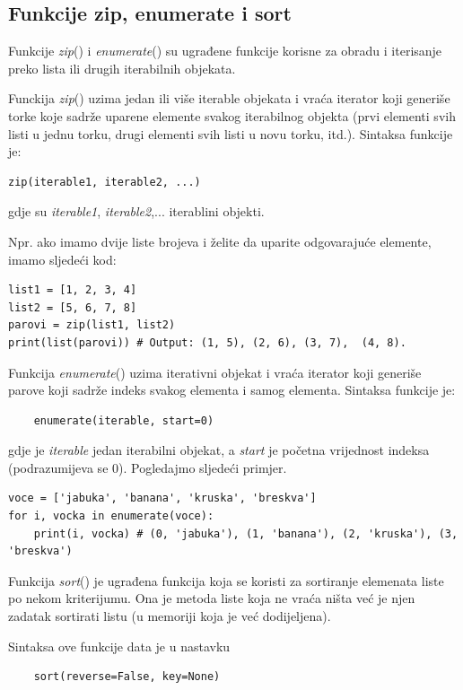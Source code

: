 \subsection{Funkcije zip, enumerate i sort}
Funkcije  \textit{zip}() i \textit{enumerate}() su ugrađene funkcije korisne za obradu i iterisanje preko lista ili drugih iterabilnih objekata.

Funckija \textit{zip}() uzima jedan ili više iterable objekata i vraća iterator koji generiše torke koje sadrže uparene elemente svakog iterabilnog objekta (prvi elementi svih listi u jednu torku, drugi elementi svih listi u novu torku, itd.). Sintaksa funkcije je:
\begin{verbatim}
zip(iterable1, iterable2, ...)
\end{verbatim}
gdje su \emph{iterable1}, \emph{iterable2},... iterablini objekti. 

Npr. ako imamo dvije liste brojeva i želite da uparite odgovarajuće elemente, imamo sljedeći kod:
\begin{verbatim}
list1 = [1, 2, 3, 4]
list2 = [5, 6, 7, 8]
parovi = zip(list1, list2) 
print(list(parovi)) # Output: (1, 5), (2, 6), (3, 7),  (4, 8).
\end{verbatim}
Funkcija \textit{enumerate}() uzima iterativni objekat i vraća iterator koji generiše parove koji sadrže indeks svakog elementa i samog elementa. Sintaksa funkcije je:
\begin{verbatim}
	enumerate(iterable, start=0)
\end{verbatim}
gdje je \textit{iterable} jedan iterabilni objekat, a \textit{start} je početna vrijednost indeksa (podrazumijeva se 0). Pogledajmo sljedeći primjer. 

\begin{verbatim}
voce = ['jabuka', 'banana', 'kruska', 'breskva']
for i, vocka in enumerate(voce):
    print(i, vocka) # (0, 'jabuka'), (1, 'banana'), (2, 'kruska'), (3, 'breskva')
\end{verbatim}

Funkcija \textit{sort}() je ugrađena funkcija koja se koristi za sortiranje elemenata   liste po nekom kriterijumu. Ona je metoda liste koja ne vraća ništa već je njen zadatak sortirati listu (u memoriji koja je već dodijeljena).

Sintaksa ove funkcije data je u nastavku 
\begin{verbatim}
	sort(reverse=False, key=None)
\end{verbatim}

